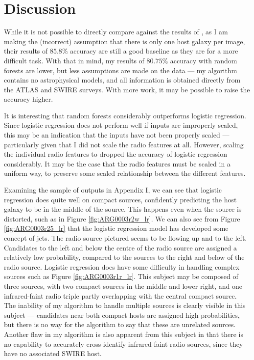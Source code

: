 \documentclass[a4paper]{article}
\newcommand{\fig}{Figure }
\newcommand{\app}{Appendix }
\begin{document}

  \section{Discussion}

    While it is not possible to directly compare against the results of \citet{fan15}, as I am making the (incorrect) assumption that there is only one host galaxy per image, their results of $85.8\%$ accuracy are still a good baseline as they are for a more difficult task. With that in mind, my results of $80.75\%$ accuracy with random forests are lower, but less assumptions are made on the data --- my algorithm contains no astrophysical models, and all information is obtained directly from the ATLAS and SWIRE surveys. With more work, it may be possible to raise the accuracy higher.

    It is interesting that random forests considerably outperforms logistic regression. Since logistic regression does not perform well if inputs are improperly scaled, this may be an indication that the inputs have not been properly scaled --- particularly given that I did not scale the radio features at all. However, scaling the individual radio features to dropped the accuracy of logistic regression considerably. It may be the case that the radio features must be scaled in a uniform way, to preserve some scaled relationship between the different features.

    Examining the sample of outputs in \app I, we can see that logistic regression does quite well on compact sources, confidently predicting the host galaxy to be in the middle of the source. This happens even when the source is distorted, such as in \fig \ref{fig:ARG0003r2w_lr}. We can also see from \fig \ref{fig:ARG0003r25_lr} that the logistic regression model has developed some concept of jets. The radio source pictured seems to be flowing up and to the left. Candidates to the left and below the centre of the radio source are assigned a relatively low probability, compared to the sources to the right and below of the radio source. Logistic regression does have some difficulty in handling complex sources such as \fig \ref{fig:ARG0003r1r_lr}. This subject may be composed of three sources, with two compact sources in the middle and lower right, and one infrared-faint radio triple partly overlapping with the central compact source. The inability of my algorithm to handle multiple sources is clearly visible in this subject --- candidates near both compact hosts are assigned high probabilities, but there is no way for the algorithm to say that these are unrelated sources. Another flaw in my algorithm is also apparent from this subject in that there is no capability to accurately cross-identify infrared-faint radio sources, since they have no associated SWIRE host.
\end{document}
